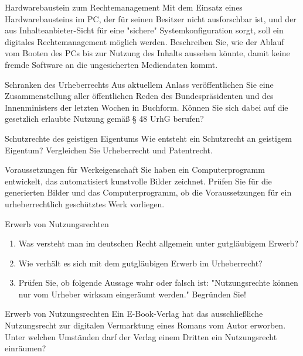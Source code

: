 \documentclass{article}
\begin{document}
\begin{exercise}{Hardwarebaustein zum Rechtemanagement}
  Mit dem Einsatz eines Hardwarebausteins im PC, der für seinen Besitzer nicht ausforschbar ist, und der aus Inhalteanbieter-Sicht für eine "sichere" Systemkonfiguration sorgt, soll ein digitales Rechtemanagement möglich werden. Beschreiben Sie, wie der Ablauf vom Booten des PCs bis zur Nutzung des Inhalts aussehen könnte, damit keine fremde Software an die ungesicherten Mediendaten kommt.
\end{exercise}

\begin{exercise}{Schranken des Urheberrechts}
  Aus aktuellem Anlass veröffentlichen Sie eine Zusammenstellung aller öffentlichen Reden des Bundespräsidenten und des Innenministers der letzten Wochen in Buchform. Können Sie sich dabei auf die gesetzlich erlaubte Nutzung gemäß § 48 UrhG berufen?
\end{exercise}

\begin{exercise}{Schutzrechte des geistigen Eigentums}
  Wie entsteht ein Schutzrecht an geistigem Eigentum? Vergleichen Sie Urheberrecht und Patentrecht.
\end{exercise}

\begin{exercise}{Voraussetzungen für Werkeigenschaft}
  Sie haben ein Computerprogramm entwickelt, das automatisiert kunstvolle Bilder zeichnet. Prüfen Sie für die generierten Bilder und das Computerprogramm, ob die Voraussetzungen für ein urheberrechtlich geschütztes Werk vorliegen.
\end{exercise}

\begin{exercise}{Erwerb von Nutzungsrechten}
  \begin{enumerate}
    \item Was versteht man im deutschen Recht allgemein unter gutgläubigem Erwerb?
    \item Wie verhält es sich mit dem gutgläubigen Erwerb im Urheberrecht?
    \item Prüfen Sie, ob folgende Aussage wahr oder falsch ist: "Nutzungsrechte können nur vom Urheber wirksam eingeräumt werden." Begründen Sie!
  \end{enumerate}
\end{exercise}

\begin{exercise}{Erwerb von Nutzungsrechten}
  Ein E-Book-Verlag hat das ausschließliche Nutzungsrecht zur digitalen Vermarktung eines Romans vom Autor erworben. Unter welchen Umständen darf der Verlag einem Dritten ein Nutzungsrecht einräumen?
\end{exercise}
\end{document}

